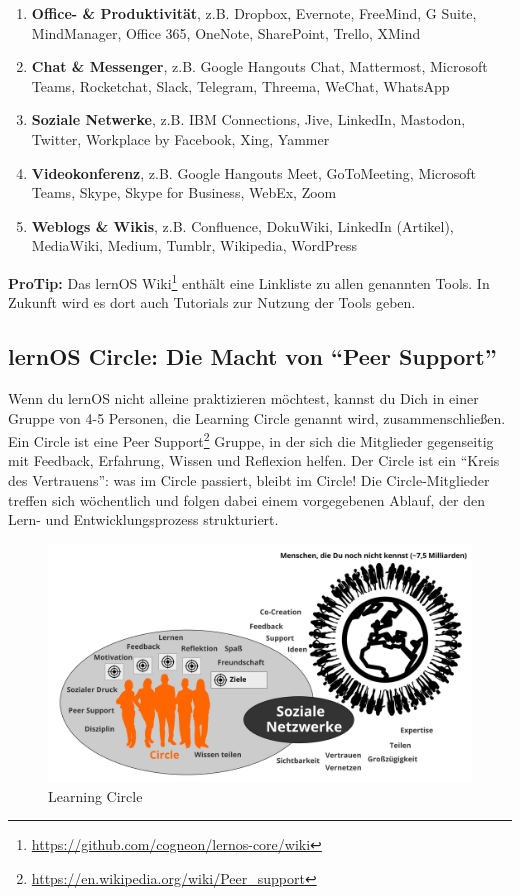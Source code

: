 \documentclass[
  ngerman,
  paper=a4,
,captions=tableheading
]{scrartcl}
\DeclareRobustCommand{\href}[2]{#2\footnote{\url{#1}}}
\providecommand{\tightlist}{%
  \setlength{\itemsep}{0pt}\setlength{\parskip}{0pt}}
\begin{document}
\begin{enumerate}
\def\labelenumi{\arabic{enumi}.}
\tightlist
\item
  \textbf{Office- \& Produktivität}, z.B. Dropbox, Evernote, FreeMind, G
  Suite, MindManager, Office 365, OneNote, SharePoint, Trello, XMind
\item
  \textbf{Chat \& Messenger}, z.B. Google Hangouts Chat, Mattermost,
  Microsoft Teams, Rocketchat, Slack, Telegram, Threema, WeChat,
  WhatsApp
\item
  \textbf{Soziale Netwerke}, z.B. IBM Connections, Jive, LinkedIn,
  Mastodon, Twitter, Workplace by Facebook, Xing, Yammer
\item
  \textbf{Videokonferenz}, z.B. Google Hangouts Meet, GoToMeeting,
  Microsoft Teams, Skype, Skype for Business, WebEx, Zoom
\item
  \textbf{Weblogs \& Wikis}, z.B. Confluence, DokuWiki, LinkedIn
  (Artikel), MediaWiki, Medium, Tumblr, Wikipedia, WordPress
\end{enumerate}

\textbf{ProTip:} Das
\href{https://github.com/cogneon/lernos-core/wiki}{lernOS Wiki} enthält
eine Linkliste zu allen genannten Tools. In Zukunft wird es dort auch
Tutorials zur Nutzung der Tools geben.

\hypertarget{lernos-circle-die-macht-von-peer-support}{%
\subsection{lernOS Circle: Die Macht von ``Peer
Support''}\label{lernos-circle-die-macht-von-peer-support}}

Wenn du lernOS nicht alleine praktizieren möchtest, kannst du Dich in
einer Gruppe von 4-5 Personen, die Learning Circle genannt wird,
zusammenschließen. Ein Circle ist eine
\href{https://en.wikipedia.org/wiki/Peer_support}{Peer Support} Gruppe,
in der sich die Mitglieder gegenseitig mit Feedback, Erfahrung, Wissen
und Reflexion helfen. Der Circle ist ein ``Kreis des Vertrauens'': was
im Circle passiert, bleibt im Circle! Die Circle-Mitglieder treffen sich
wöchentlich und folgen dabei einem vorgegebenen Ablauf, der den Lern-
und Entwicklungsprozess strukturiert.

\begin{figure}
\centering
\includegraphics{./tex2pdf.-af94b87e0fdb9aa6/0d67e1021e5c580615fa48b0a1dfe050338091a7.png}
\caption{Learning Circle}
\end{figure}
\end{document}
